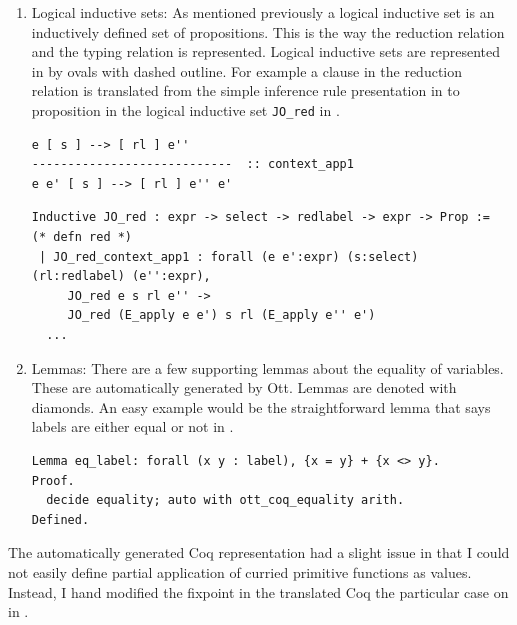 \documentclass[12pt,twoside,notitlepage]{report}
\begin{document}
\begin{enumerate}
{\begin{minipage}{\linewidth}
\end{minipage}	
}
\item{Logical inductive sets: As mentioned previously a logical inductive set is an inductively defined set of propositions. This is the way the reduction relation and the typing relation is represented. Logical inductive sets are represented in  by ovals with dashed outline. For example a clause in the reduction relation is translated from the simple inference rule presentation in  to proposition in the logical inductive set \verb|JO_red| in .


\begin{lstlisting}[language={Ott}, caption={Ott reduction relation example}, label={lst:ottcontextapp1}]
e [ s ] --> [ rl ] e''
----------------------------  :: context_app1
e e' [ s ] --> [ rl ] e'' e'
\end{lstlisting}


\begin{minipage}{\linewidth}

\begin{lstlisting}[language={Coq},caption={Coq reduction relation example}, label={lst:coqlogind}]
Inductive JO_red : expr -> select -> redlabel -> expr -> Prop :=    (* defn red *)
 | JO_red_context_app1 : forall (e e':expr) (s:select) (rl:redlabel) (e'':expr),
     JO_red e s rl e'' ->
     JO_red (E_apply e e') s rl (E_apply e'' e')
  ...
\end{lstlisting}

\end{minipage}	
}
\item{Lemmas: There are a few supporting lemmas about the equality of variables. These are automatically generated by Ott. Lemmas are denoted with diamonds. An easy example would be the straightforward lemma that says labels are either equal or not in .

\begin{minipage}{\linewidth}

\begin{lstlisting}[language={Coq},caption={Coq label equality lemma}, label={lst:coqeqlabel}]
Lemma eq_label: forall (x y : label), {x = y} + {x <> y}.
Proof.
  decide equality; auto with ott_coq_equality arith.
Defined.
\end{lstlisting}

\end{minipage}	

}
\end{enumerate} 
The automatically generated Coq representation had a slight issue in that I could not easily define partial application of curried primitive functions as values. Instead, I hand modified the fixpoint in the translated Coq the particular case on  in .
\end{document}
